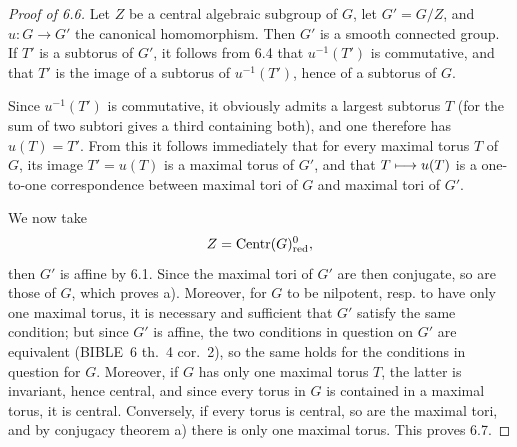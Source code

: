 \begin{proof}[Proof of 6.6]
Let $Z$ be a central algebraic subgroup of $G$, let $G'=G/Z$, and $u:G\to G'$ the canonical homomorphism. Then $G'$ is a smooth connected group. If $T'$ is a subtorus of $G'$, it follows from 6.4 that $u^{-1}(T')$ is commutative, and that $T'$ is the image of a subtorus of $u^{-1}(T')$, hence of a subtorus of $G$.

Since $u^{-1}(T')$ is commutative, it obviously admits a largest subtorus $T$ (for the sum of two subtori gives a third containing both), and one therefore has $u(T)=T'$. From this it follows immediately that for every maximal torus $T$ of $G$, its image $T'=u(T)$ is a maximal torus of $G'$, and that $T\longmapsto u(T)$ is a one-to-one correspondence between maximal tori of $G$ and maximal tori of $G'$.

We now take
\[
Z=\operatorname{Centr}(G)^0_{\mathrm{red}},
\]
then $G'$ is affine by 6.1. Since the maximal tori of $G'$ are then conjugate, so are those of $G$, which proves a). Moreover, for $G$ to be nilpotent, resp. to have only one maximal torus, it is necessary and sufficient that $G'$ satisfy the same condition; but since $G'$ is affine, the two conditions in question on $G'$ are equivalent (BIBLE~6 th.~4 cor.~2), so the same holds for the conditions in question for $G$. Moreover, if $G$ has only one maximal torus $T$, the latter is invariant, hence central, and since every torus in $G$ is contained in a maximal torus, it is central. Conversely, if every torus is central, so are the maximal tori, and by conjugacy theorem a) there is only one maximal torus. This proves 6.7.


\end{proof}
